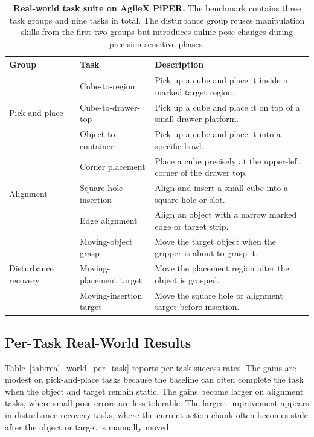 \begin{table}[t]
  \centering
  \small
  \setlength{\tabcolsep}{5.5pt}
  \renewcommand{\arraystretch}{1.15}
  \caption{\textbf{Real-world task suite on AgileX PiPER.}
  The benchmark contains three task groups and nine tasks in total. The disturbance group reuses manipulation skills from the first two groups but introduces online pose changes during precision-sensitive phases.}
  \label{tab:real_world_task_details}
  \begin{tabular}{lll}
    \toprule
    \rowcolor{headerbg}
    \textbf{Group} & \textbf{Task} & \textbf{Description} \\
    \midrule
    \multirow{3}{*}{Pick-and-place}
    & Cube-to-region 
    & Pick up a cube and place it inside a marked target region. \\
    & Cube-to-drawer-top 
    & Pick up a cube and place it on top of a small drawer platform. \\
    & Object-to-container 
    & Pick up a cube and place it into a specific bowl. \\
    \midrule
    \multirow{3}{*}{Alignment}
    & Corner placement 
    & Place a cube precisely at the upper-left corner of the drawer top. \\
    & Square-hole insertion 
    & Align and insert a small cube into a square hole or slot. \\
    & Edge alignment 
    & Align an object with a narrow marked edge or target strip. \\
    \midrule
    \multirow{3}{*}{Disturbance recovery}
    & Moving-object grasp 
    & Move the target object when the gripper is about to grasp it. \\
    & Moving-placement target 
    & Move the placement region after the object is grasped. \\
    & Moving-insertion target 
    & Move the square hole or alignment target before insertion. \\
    \bottomrule
  \end{tabular}
\end{table}

\subsection{Per-Task Real-World Results}
\label{app:real_world_per_task_results}

Table~\ref{tab:real_world_per_task} reports per-task success rates. The gains are modest on pick-and-place tasks because the baseline can often complete the task when the object and target remain static. The gains become larger on alignment tasks, where small pose errors are less tolerable. The largest improvement appears in disturbance recovery tasks, where the current action chunk often becomes stale after the object or target is manually moved.


